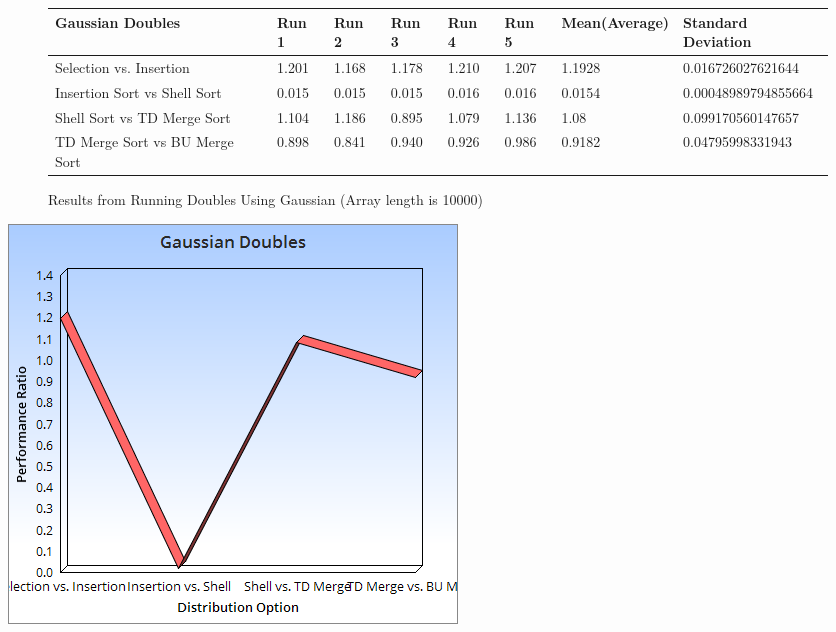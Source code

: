 \documentclass{article}
\begin{document}
\begin{figure}[H]
\centering
\begin{adjustwidth}{-3.4cm}{}
\begin{tabular}{| l | l | l | l | l | l | l | l |}
\hline
Gaussian Doubles & Run 1 & Run 2 & Run 3 & Run 4 & Run 5 & Mean(Average) & Standard Deviation\\ \hline
Selection vs. Insertion  & 1.201 & 1.168 & 1.178 & 1.210 & 1.207 & 1.1928 &  0.016726027621644 \\ \hline
Insertion Sort vs Shell Sort & 0.015 & 0.015 & 0.015 & 0.016 & 0.016 & 0.0154 & 0.00048989794855664 \\ \hline
Shell Sort vs TD Merge Sort &  1.104 & 1.186 & 0.895 & 1.079 & 1.136 & 1.08 & 0.099170560147657 \\ \hline
TD Merge Sort vs BU Merge Sort & 0.898 & 0.841 & 0.940 & 0.926 & 0.986 & 0.9182 & 0.04795998331943\\ \hline
\end{tabular}
\caption{Results from Running Doubles Using Gaussian (Array length is 10000)}
\end{adjustwidth}
\end{figure}
\includegraphics[scale=0.5]{GaussianDoubles.png}
\end{document}
